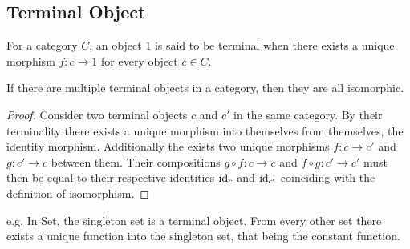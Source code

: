 \subsection{Terminal Object}

\begin{definition}
  For a category $C$, an object $1$ is said to be terminal when there exists a
  unique morphism $f: c\to 1$ for every object $c\in C$.
  \parencite{awodey:category_theory}
\end{definition}

\begin{theorem}\label{thm:term_obj_iso} If
  there are multiple terminal objects in a category, then they are all
  isomorphic.

  \begin{proof}
    Consider two terminal objects $c$ and $c'$ in the same category. By their
    terminality there exists a unique morphism into themselves from themselves,
    the identity morphism. Additionally the exists two unique morphisms $f:c\to
    c'$ and $g:c' \to c$ between them. Their compositions $g\circ f:c\to c$ and
    $f\circ g:c'\to c'$ must then be equal to their respective identities
    $\mathrm{id}_c$ and $\mathrm{id}_{c'}$ coinciding with the definition of isomorphism.
  \end{proof}
\end{theorem}

e.g. In Set, the singleton set is a terminal object. From every other set
there exists a unique function into the singleton set, that being the constant
function.